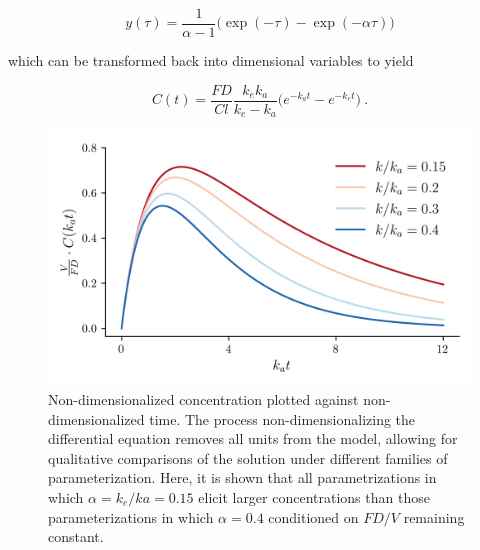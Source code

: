 \begin{equation}\label{key}
	y(\tau) = \dfrac{1}{\alpha -1} \Big( \exp(-\tau) - \exp(-\alpha \tau) \Big)
\end{equation}

\noindent which can be transformed back into dimensional variables to yield 

\begin{equation}\label{onecompartment_PKPD}
	C(t) = \dfrac{F D}{Cl}\dfrac{k_ek_a}{k_e - k_a}\Big(e^{-k_at} - e^{-k_et}\Big) \>.
\end{equation}

\begin{figure}[h!]
	\centering
	\includegraphics{figures/pkcurves.png}
	\caption[Non-dimensionalized solutions to pharmacokinetic differential equation] {Non-dimensionalized concentration plotted against non-dimensionalized time.  The process non-dimensionalizing the differential equation removes all units from the model, allowing for qualitative comparisons of the solution under different families of parameterization.  Here, it is shown that all parametrizations in which $\alpha = k_e/ka = 0.15$ elicit larger concentrations than those parameterizations in which $\alpha=0.4$ conditioned on $FD/V$ remaining constant.}
	\label{fig:pkcureves}
\end{figure}

